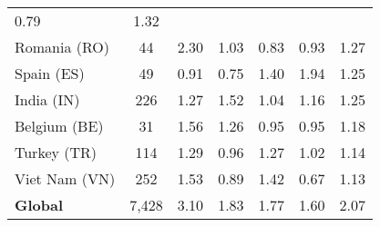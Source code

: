 \begin{table}[t]
{\begin{tabular}{lcccccc}
    \color{black} 0.79 & \color{black} 1.32 \\
    Romania (RO) & \color{black} 44 & {\cellcolor[HTML]{6AAED6}}
    \color[HTML]{F1F1F1} \color{black} 2.30 & {\cellcolor[HTML]{EAF2FB}}
    \color[HTML]{000000} \color{black} 1.03 & {\cellcolor[HTML]{F7FBFF}}
    \color[HTML]{000000} \color{black} 0.83 & {\cellcolor[HTML]{F1F7FD}}
    \color[HTML]{000000} \color{black} 0.93 & \color{black} 1.27 \\
    Spain (ES) & \color{black} 49 & {\cellcolor[HTML]{EAF2FB}} \color[HTML]{000000}
    \color{black} 0.91 & {\cellcolor[HTML]{F7FBFF}} \color[HTML]{000000}
    \color{black} 0.75 & {\cellcolor[HTML]{BFD8ED}} \color[HTML]{000000}
    \color{black} 1.40 & {\cellcolor[HTML]{6AAED6}} \color[HTML]{F1F1F1}
    \color{black} 1.94 & \color{black} 1.25 \\
    India (IN) & \color{black} 226 & {\cellcolor[HTML]{C8DCF0}}
    \color[HTML]{000000} \color{black} 1.27 & {\cellcolor[HTML]{6AAED6}}
    \color[HTML]{F1F1F1} \color{black} 1.52 & {\cellcolor[HTML]{F7FBFF}}
    \color[HTML]{000000} \color{black} 1.04 & {\cellcolor[HTML]{DFEBF7}}
    \color[HTML]{000000} \color{black} 1.16 & \color{black} 1.25 \\
    Belgium (BE) & \color{black} 31 & {\cellcolor[HTML]{6CAED6}}
    \color[HTML]{F1F1F1} \color{black} 1.56 & {\cellcolor[HTML]{C6DBEF}}
    \color[HTML]{000000} \color{black} 1.26 & {\cellcolor[HTML]{F7FBFF}}
    \color[HTML]{000000} \color{black} 0.95 & {\cellcolor[HTML]{F7FBFF}}
    \color[HTML]{000000} \color{black} 0.95 & \color{black} 1.18 \\
    Turkey (TR) & \color{black} 114 & {\cellcolor[HTML]{6CAED6}}
    \color[HTML]{F1F1F1} \color{black} 1.29 & {\cellcolor[HTML]{F7FBFF}}
    \color[HTML]{000000} \color{black} 0.96 & {\cellcolor[HTML]{7AB6D9}}
    \color[HTML]{000000} \color{black} 1.27 & {\cellcolor[HTML]{E3EEF9}}
    \color[HTML]{000000} \color{black} 1.02 & \color{black} 1.14 \\
    Viet Nam (VN) & \color{black} 252 & {\cellcolor[HTML]{6AAED6}}
    \color[HTML]{F1F1F1} \color{black} 1.53 & {\cellcolor[HTML]{DFEBF7}}
    \color[HTML]{000000} \color{black} 0.89 & {\cellcolor[HTML]{87BDDC}}
    \color[HTML]{000000} \color{black} 1.42 & {\cellcolor[HTML]{F7FBFF}}
    \color[HTML]{000000} \color{black} 0.67 & \color{black} 1.13 \\

    \midrule
    {\bf Global} & \color{black} 7,428 & {\cellcolor[HTML]{6AAED6}}
    \color[HTML]{F1F1F1} \color{black} 3.10 & {\cellcolor[HTML]{DCE9F6}}
    \color[HTML]{000000} \color{black} 1.83 & {\cellcolor[HTML]{F7FBFF}}
    \color[HTML]{000000} \color{black} 1.77 & {\cellcolor[HTML]{F7FBFF}}
    \color[HTML]{000000} \color{black} 1.60 & \color{black} 2.07 \\
    

\end{tabular}}
\end{table}
